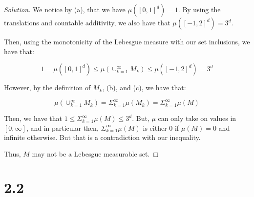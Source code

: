\documentclass[10pt]{article}
\begin{document}
\begin{proof}[Solution]
We notice by (a), that we have $\mu([0,1]^d) = 1$. By using the translations and countable additivity, we also have that $\mu( [-1,2]^d) = 3^d$.

Then, using the monotonicity of the Lebesgue measure with our set inclusions, we have that:

$$ 1 = \mu([0,1]^d) \leq \mu(\cup_{k=1}^\infty M_k) \leq \mu( [-1,2]^d) = 3^d $$

However, by the definition of $M_k$, (b), and (c), we have that:

$$  \mu(\cup_{k=1}^\infty M_k) = \Sigma_{k=1}^\infty \mu(M_k) = \Sigma_{k=1}^\infty \mu(M) $$

Then, we have that $1 \leq \Sigma_{k=1}^\infty \mu(M) \leq 3^d$. But, $\mu$ can only take on values in $[0,\infty]$, and in particular then, $ \Sigma_{k=1}^\infty \mu(M)$ is either $0$ if $\mu(M) = 0$ and infinite otherwise. But that is a contradiction with our inequality.

Thus, $M$ may not be a Lebesgue measurable set. 

\end{proof}

\section*{2.2}
\end{document}
